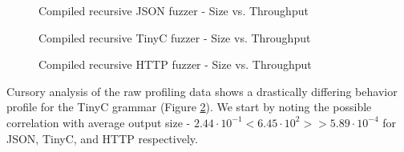 \documentclass[8pt, twoside]{extarticle}
\begin{document}
\begin{figure}[hbt!]
	\centering

	
	\caption{Compiled recursive JSON fuzzer - Size vs. Throughput}
	\label{fig:json_size_vs_throughput_plot}
\end{figure}

\begin{figure}[hbt!]
	\centering

	
	\caption{Compiled recursive TinyC fuzzer - Size vs. Throughput}
	\label{fig:tinyc_size_vs_throughput_plot}
\end{figure}

\begin{figure}[hbt!]
	\centering

	
	\caption{Compiled recursive HTTP fuzzer - Size vs. Throughput}
	\label{fig:http_size_vs_throughput_plot}
\end{figure}

Cursory analysis of the raw profiling data shows a drastically differing behavior profile for the TinyC grammar (Figure \ref{fig:tinyc_size_vs_throughput_plot}). We start by noting the possible correlation with average output size - $2.44 \cdot 10^{-1} < 6.45 \cdot 10^2 >> 5.89 \cdot 10^{-4}$ for JSON, TinyC, and HTTP respectively. 
\end{document}
